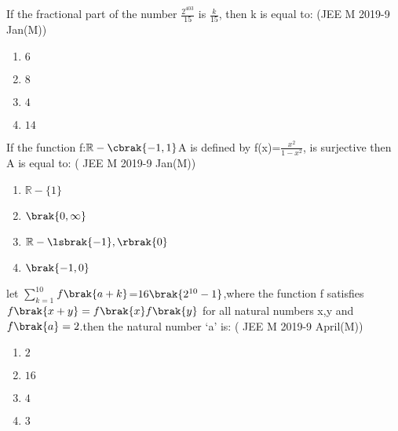 
\iffalse
  \title{FUNCTIONS}
  \author{MALAKALA BALA SUBRAHMANYA ARAVIND}
  \section{mcq-single}
\fi

    \item If the fractional part of the number $\frac{2^{403}}{15}$ is $\frac{k}{15}$, then k is equal to:
    \hfill {(JEE M 2019-9 Jan(M))} 
\begin{enumerate}
    \item $6$
    \item $8$
    \item $4$
    \item $14$
\end{enumerate} 
\item If the function f:$\mathbb{R}-\cbrak{-1,1}$A is defined by f(x)=$\frac{x^2}{1-x^2}$, is surjective then A is equal to:
   \hfill {( JEE M 2019-9 Jan(M))}
\begin{enumerate}
    \item $\mathbb{R}-\{1\}$
    \item $\brak{0,\infty}$
    \item $\mathbb{R}-\lsbrak{-1},\rbrak{0}$
    \item $\brak{-1,0}$
\end{enumerate}
  \item let $\sum\limits_{k=1}^{10}$$f\brak{a+k}$=$16\brak{2^{10}-1}$,where the function f satisfies $f\brak{x+y}=f\brak{x}f\brak{y}$ for all natural numbers x,y and $f\brak{a}=2$.then the natural number `a' is:
    \hfill {( JEE M 2019-9 April(M))} 
\begin{enumerate}
    \item $2$
    \item $16$
    \item $4$
    \item $3$   
\end{enumerate} 


